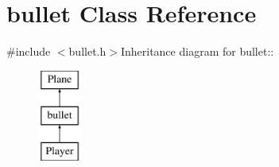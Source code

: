 \hypertarget{classbullet}{
\section{bullet Class Reference}
\label{classbullet}
}


{\ttfamily \#include $<$bullet.h$>$}Inheritance diagram for bullet::\begin{figure}[H]
\begin{center}
\leavevmode
\includegraphics[height=3cm]{classbullet}
\end{center}
\end{figure}
